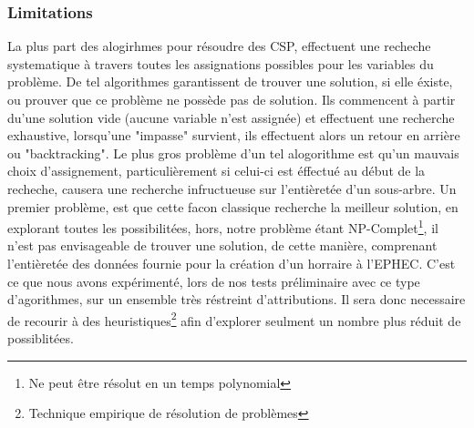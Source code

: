 \subsubsection{Limitations}
La plus part des alogirhmes pour résoudre des CSP, effectuent une recheche systematique à travers toutes les assignations possibles pour les variables du problème. De tel algorithmes garantissent de trouver une solution, si elle éxiste, ou prouver que ce problème ne possède pas de solution.  
Ils commencent à partir du'une solution vide (aucune variable n'est assignée) et effectuent une recherche exhaustive,
lorsqu'une "impasse" survient, ils effectuent alors un retour en arrière ou "backtracking".  \newline
Le plus gros problème d'un tel alogorithme est qu'un mauvais choix d'assignement,
 particulièrement si celui-ci est éffectué au début de la recheche, causera une recherche infructueuse sur l'entièretée d'un sous-arbre. 
\newline
\indent
Un premier problème, est que cette facon classique recherche la meilleur solution, en explorant toutes les possibilitées, hors, notre problème étant NP-Complet\footnote{Ne peut être résolut en un temps polynomial}, il n'est pas envisageable de trouver une solution, de cette manière, comprenant l'entièretée des données fournie pour la création d'un horraire à l'EPHEC.  C'est ce que nous avons expérimenté, lors de nos tests préliminaire avec ce type d'agorithmes, sur un ensemble très réstreint d'attributions. 
\newline
Il sera donc necessaire de recourir à des heuristiques\footnote{Technique empirique de résolution de problèmes} afin d'explorer seulment un nombre plus réduit de possiblitées.
\newline


